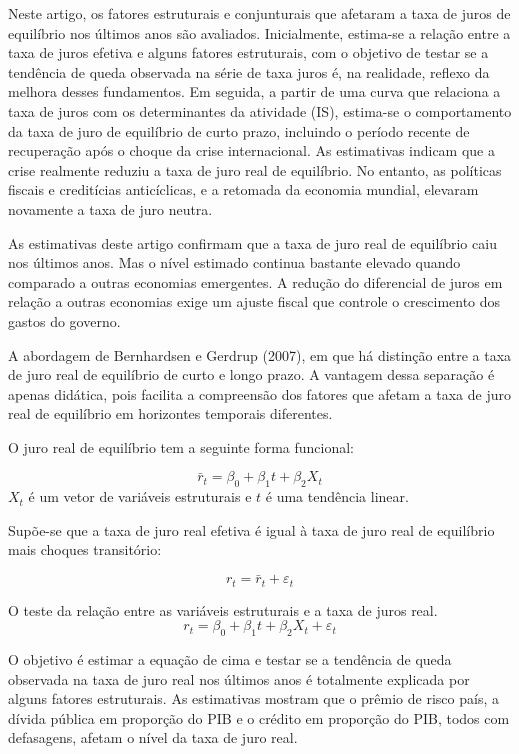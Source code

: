 Neste artigo, os fatores estruturais e conjunturais que afetaram a taxa de juros de equilíbrio nos últimos anos são avaliados. Inicialmente, estima-se a relação entre a taxa de juros efetiva e alguns fatores estruturais, com o objetivo de testar se
a tendência de queda observada na série de taxa juros é, na realidade, reflexo da melhora desses fundamentos. Em seguida, a partir de uma curva que relaciona a taxa de juros com os determinantes da atividade (IS), estima-se o comportamento
da taxa de juro de equilíbrio de curto prazo, incluindo o período recente de recuperação após o choque da crise internacional. As estimativas indicam que a crise realmente reduziu a taxa de juro real de equilíbrio. No entanto, as políticas fiscais e creditícias anticíclicas, e a retomada da economia mundial, elevaram novamente a taxa de juro neutra.

As estimativas deste artigo confirmam que a taxa de juro real de equilíbrio caiu nos últimos anos. Mas o nível estimado continua bastante elevado quando comparado a outras economias emergentes. A redução do diferencial de juros em relação a outras economias exige um ajuste fiscal que controle o crescimento dos
gastos do governo.

A abordagem de Bernhardsen e Gerdrup (2007), em que há distinção entre a taxa de juro real de equilíbrio de curto e longo
prazo. A vantagem dessa separação é apenas didática, pois facilita a compreensão dos fatores que afetam a taxa de juro real de equilíbrio em horizontes temporais diferentes.

O juro real de equilíbrio tem a seguinte forma
funcional:

$$
\bar{r}_{t}=\beta_{0}+\beta_{1}t+\beta_{2} X_{t}
$$
$ X_{t}$ é um vetor de variáveis estruturais e $t$ é uma tendência linear.

Supõe-se que a taxa de juro real efetiva é igual à taxa de
juro real de equilíbrio mais choques transitório:

$$
r_{t}=\bar{r}_{t}+\varepsilon_{t}
$$

O teste da relação entre as variáveis estruturais e a taxa de juros real.
$$
r_{t}=\beta_{0}+\beta_{1}t+\beta_{2} X_{t}+\varepsilon_{t}
$$

O objetivo é estimar a equação de cima e testar se a tendência de queda observada na taxa de juro real nos últimos anos é totalmente explicada por alguns fatores estruturais. As estimativas mostram que o prêmio de risco país, a dívida pública em proporção do PIB e o crédito em proporção do PIB, todos com defasagens, afetam o nível da taxa de juro real.

